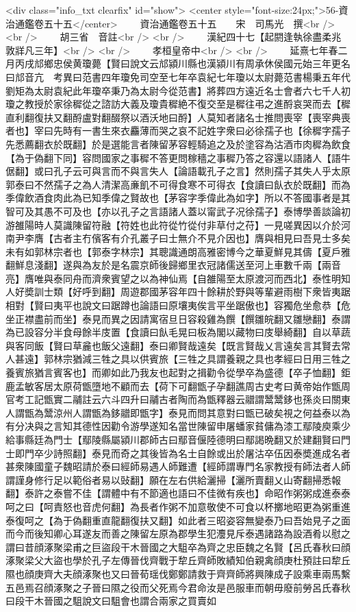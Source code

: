 <div class="info_txt clearfix" id="show">
<center style="font-size:24px;">56-資治通鑑卷五十五</center>
  　　資治通鑑卷五十五　　宋　司馬光　撰<br />
<br />
　　胡三省　音註<br />
<br />
　　漢紀四十七【起閼逢執徐盡柔兆敦牂凡三年】<br />
<br />
　　孝桓皇帝中<br />
<br />
　　延熹七年春二月丙戌邟鄉忠侯黄瓊薨【賢曰說文云邟潁川縣也漢潁川有周承休侯國元始三年更名曰邟音亢　考異曰范書四年瓊免司空至七年卒袁紀七年瓊以太尉薨范書楊秉五年代劉矩為太尉袁紀此年瓊卒秉乃為太尉今從范書】將葬四方遠近名士會者六七千人初瓊之教授於家徐穉從之諮訪大義及瓊貴穉絶不復交至是穉往弔之進酹哀哭而去【穉直利翻復扶又翻酹盧對翻醊祭以酒沃地曰酹】人莫知者諸名士推問喪宰【喪宰典喪者也】宰曰先時有一書生來衣麤薄而哭之哀不記姓字衆曰必徐孺子也【徐穉字孺子先悉薦翻衣於既翻】於是選能言者陳留茅容輕騎追之及於塗容為沽酒市肉穉為飲食【為于偽翻下同】容問國家之事穉不答更問稼穡之事穉乃答之容還以語諸人【語牛倨翻】或曰孔子云可與言而不與言失人【論語載孔子之言】然則孺子其失人乎太原郭泰曰不然孺子之為人清潔高亷飢不可得食寒不可得衣【食讀曰飤衣於既翻】而為季偉飲酒食肉此為已知季偉之賢故也【茅容字季偉此為如字】所以不答國事者是其智可及其愚不可及也【亦以孔子之言語諸人蓋以甯武子况徐孺子】泰博學善談論初游雒陽時人莫識陳留符融【符姓也此符從竹從付非草付之苻】一見嗟異因以介於河南尹李膺【古者主冇儐客有介孔叢子曰士無介不見介因也】膺與相見曰吾見士多矣未有如郭林宗者也【郭泰字林宗】其聰識通朗高雅密博今之華夏鮮見其儔【夏戶雅翻鮮息淺翻】遂與為友於是名震京師後歸鄉里衣冠諸儒送至河上車數千兩【兩音亮】膺唯與泰同舟而濟衆賓望之以為神仙焉【自雒陽至太原渡河而西北】泰性明知人好奬訓士類【好呼到翻】周遊郡國茅容年四十餘耕於野與等輩避雨樹下衆皆夷踞相對【賢曰夷平也說文曰踞蹲也論語曰原壤夷俟言平坐踞傲也】容獨危坐愈恭【危坐正襟盡前而坐】泰見而異之因請寓宿旦日容殺雞為饌【饌雛皖翻又雛戀翻】泰謂為已設容分半食母餘半庋置【食讀曰飤毛晃曰板為閣以藏物曰庋舉綺翻】自以草蔬與客同飯【賢曰草麄也飯父遠翻】泰曰卿賢哉遠矣【既言賢哉乂言遠矣言其賢去常人甚遠】郭林宗猶減三牲之具以供賓旅【三牲之具謂養親之具也孝經曰日用三牲之養賓旅猶言賓客也】而卿如此乃我友也起對之揖勸令從學卒為盛德【卒子恤翻】鉅鹿孟敏客居太原荷甑墮地不顧而去【荷下可翻甑子孕翻譙周古史考曰黄帝始作甑周官考工記甑實二鬴註云六斗四升曰鬴古者陶而為甑釋器云䰝謂鬵鬵鉹也孫炎曰關東人謂甑為鬵涼州人謂甑為鉹䰝即甑字】泰見而問其意對曰甑已破矣視之何益泰以為有分决與之言知其德性因勸令游學遂知名當世陳留申屠蟠家貧傭為漆工鄢陵庾乘少給事縣廷為門士【鄢陵縣屬潁川郡師古曰鄢音偃陸德明曰鄢謁晩翻又於建翻賢曰門士即門卒少詩照翻】泰見而奇之其後皆為名士自餘或出於屠沽卒伍因泰奬進成名者甚衆陳國童子魏昭請於泰曰經師易遇人師難遭【經師謂專門名家教授有師法者人師謂謹身修行足以範俗者易以䜴翻】願在左右供給灑掃【灑所賣翻乂山寄翻掃悉報翻】泰許之泰嘗不佳【謂體中有不節適也語曰不佳微有疾也】命昭作粥粥成進泰泰呵之曰【呵責怒也音虎何翻】為長者作粥不加意敬使不可食以杯擲地昭更為粥重進泰復呵之【為于偽翻重直龍翻復扶又翻】如此者三昭姿容無變泰乃曰吾始見子之面而今而後知卿心耳遂友而善之陳留左原為郡學生犯灋見斥泰遇諸路為設酒肴以慰之謂曰昔顔涿聚梁甫之巨盜段干木晉國之大駔卒為齊之忠臣魏之名賢【呂氏春秋曰顔涿聚梁父大盜也學於孔子左傳晉伐齊戰于犂丘齊師敗績知伯親禽顔庚杜預註曰犂丘隰也顔庚齊大夫顔涿聚也又曰晉荀瑶伐鄭鄭請救于齊齊師將興陳成子設乘車兩馬繫五邑焉召顔涿聚之子晉曰隰之役而父死焉今君命汝是邑服車而朝毋廢前勞呂氏春秋曰段干木晉國之駔說文曰駔會也謂合兩家之買賣如